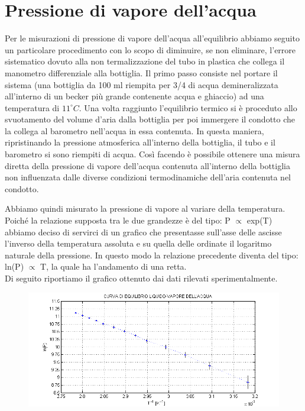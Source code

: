 \documentclass[11pt]{article}
\begin{document}
\section{Pressione di vapore dell'acqua}

Per le misurazioni di pressione di vapore dell'acqua all'equilibrio abbiamo seguito un particolare procedimento con lo scopo di diminuire, se non eliminare, l'errore sistematico dovuto alla non termalizzazione del tubo in plastica che collega il manometro differenziale alla bottiglia.
Il primo passo consiste nel portare il sistema (una bottiglia da 100 ml riempita per 3/4 di acqua demineralizzata all'interno di un becker più grande contenente acqua e ghiaccio) ad una temperatura di $11^\circ C$. Una volta raggiunto l'equilibrio termico si è proceduto allo svuotamento del volume d'aria dalla bottiglia per poi immergere il condotto che la collega al barometro nell'acqua in essa contenuta. In questa maniera, ripristinando la pressione atmosferica all'interno della bottiglia, il tubo e il barometro si sono riempiti di acqua. Così facendo è possibile ottenere una misura diretta della pressione di vapore dell'acqua contenuta all'interno della bottiglia non influenzata dalle diverse condizioni termodinamiche dell'aria contenuta nel condotto.
 

Abbiamo quindi misurato la pressione di vapore al variare della temperatura. Poiché la relazione supposta tra le due grandezze è del tipo: P $\propto$ exp(T) abbiamo deciso di servirci di un grafico che presentasse sull'asse delle ascisse l'inverso della temperatura assoluta e su quella delle ordinate il logaritmo naturale della pressione. In questo modo la relazione precedente diventa del tipo: ln(P) $\propto$ T, la quale ha l'andamento di una retta.\\
Di seguito riportiamo il grafico ottenuto dai dati rilevati sperimentalmente.

\begin{figure}[H]
\hspace{-38mm}
\includegraphics[scale=1.10]{pressione_temperatura.png}
\caption{}
\label{}
\end{figure}
\end{document}
